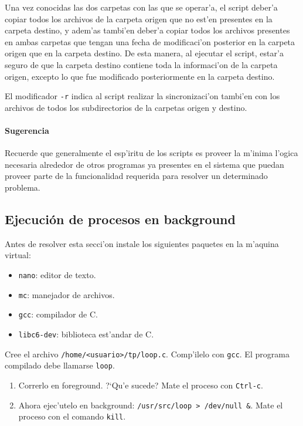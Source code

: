 Una vez conocidas las dos carpetas con las que se operar'a, el script deber'a copiar todos los archivos de la carpeta origen
que no est'en presentes en la carpeta destino, y adem'as tambi'en deber'a copiar todos los archivos presentes en ambas
carpetas que tengan una fecha de modificaci'on posterior en la carpeta origen que en la carpeta destino. De esta manera, al
ejecutar el script, estar'a seguro de que la carpeta destino contiene toda la informaci'on de la carpeta origen, excepto lo
que fue modificado posteriormente en la carpeta destino.

El modificador \texttt{-r} indica al script realizar la sincronizaci'on tambi'en con los archivos de todos los
subdirectorios de la carpetas origen y destino.

\paragraph{Sugerencia}

Recuerde que generalmente el esp'iritu de los scripts es proveer la m'inima l'ogica necesaria alrededor de otros programas
ya presentes en el sistema que puedan proveer parte de la funcionalidad requerida para resolver un determinado problema.

\subsection{Ejecuci\'on de procesos en background}

Antes de resolver esta secci'on instale los siguientes paquetes en la m'aquina virtual:

\begin{itemize}
\item \texttt{nano}: editor de texto.
\item \texttt{mc}: manejador de archivos.
\item \texttt{gcc}: compilador de C.
\item \texttt{libc6-dev}: biblioteca est'andar de C.
\end{itemize}

Cree el archivo \texttt{/home/<usuario>/tp/loop.c}. Comp'ilelo con \texttt{gcc}. El programa compilado debe llamarse
\texttt{loop}.


\begin{enumerate}
\item Correrlo en foreground. ?`Qu'e sucede? Mate el proceso con \texttt{Ctrl-c}.
\item Ahora ejec'utelo en background: \texttt{/usr/src/loop > /dev/null \&}. Mate el proceso con el comando \texttt{kill}.
\end{enumerate}


